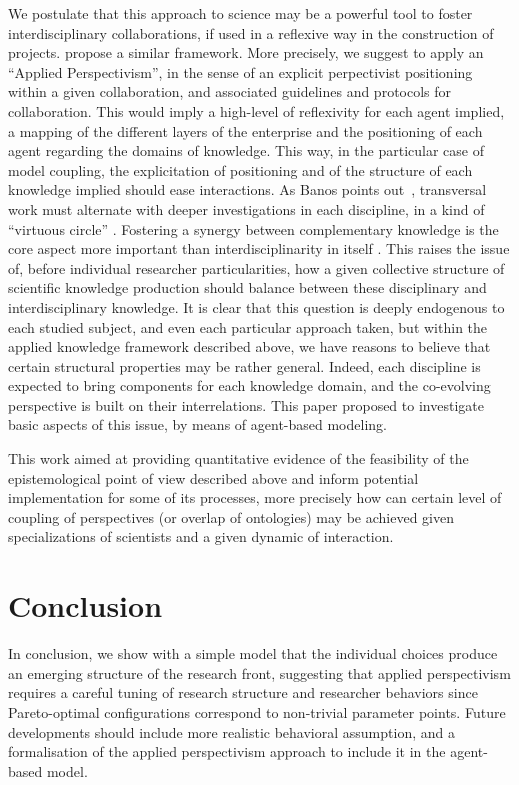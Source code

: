 \documentclass[utf8]{frontiersFPHY} %
\begin{document}
We postulate that this approach to science may be a powerful tool to foster interdisciplinary collaborations, if used in a reflexive way in the construction of projects. \cite{Ellemers7561} propose a similar framework. More precisely, we suggest to apply an ``Applied Perspectivism'', in the sense of an explicit perpectivist positioning within a given collaboration, and associated guidelines and protocols for collaboration. This would imply a high-level of reflexivity for each agent implied, a mapping of the different layers of the enterprise and the positioning of each agent regarding the domains of knowledge. This way, in the particular case of model coupling, the explicitation of positioning and of the structure of each knowledge implied should ease interactions. As Banos points out~\cite{banos2013pour}, transversal work must alternate with deeper investigations in each discipline, in a kind of ``virtuous circle'' \cite{banos2017knowledge}. Fostering a synergy between complementary knowledge is the core aspect more important than interdisciplinarity in itself \cite{leydesdorff2020measurement}. This raises the issue of, before individual researcher particularities, how a given collective structure of scientific knowledge production should balance between these disciplinary and interdisciplinary knowledge. It is clear that this question is deeply endogenous to each studied subject, and even each particular approach taken, but within the applied knowledge framework described above, we have reasons to believe that certain structural properties may be rather general. Indeed, each discipline is expected to bring components for each knowledge domain, and the co-evolving perspective is built on their interrelations. This paper proposed to investigate basic aspects of this issue, by means of agent-based modeling.


This work aimed at providing quantitative evidence of the feasibility of the epistemological point of view described above and inform potential implementation for some of its processes, more precisely how can certain level of coupling of perspectives (or overlap of ontologies) may be achieved given specializations of scientists and a given dynamic of interaction.





\section{Conclusion}

In conclusion, we show with a simple model that the individual choices produce an emerging structure of the research front, suggesting that applied perspectivism requires a careful tuning of research structure and researcher behaviors since Pareto-optimal configurations correspond to non-trivial parameter points. Future developments should include more realistic behavioral assumption, and a formalisation of the applied perspectivism approach to include it in the agent-based model.
\end{document}
